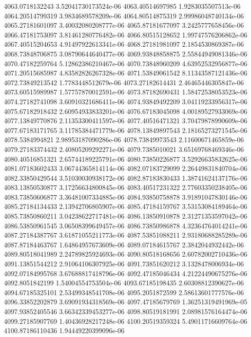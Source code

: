 {4063.0718132243 3.52041730173524e-06
4063.40514697985 1.9283035507513e-06
4064.20514799319 3.9834689578209e-06
4064.80514875319 2.99986048740134e-06
4065.27181601097 3.40032080208777e-06
4065.87181677097 3.2425777658456e-06
4066.47181753097 3.81461280776482e-06
4066.80515128652 1.99747576206862e-06
4067.40515204653 4.91497922613341e-06
4068.27181981097 2.1854530869387e-06
4068.73848706875 3.08790644640477e-06
4069.93848858875 2.55844949081346e-06
4070.47182259764 5.12862386210467e-06
4070.73848960209 4.63952532956877e-06
4071.20515685987 4.83582826267328e-06
4071.53849061542 8.11343587121436e-06
4072.73849213542 1.7783448512679e-06
4073.27182614431 2.46465446305847e-06
4073.60515989987 1.57757870012591e-06
4073.87182690431 1.58472538053523e-06
4074.27182741098 3.60910321686411e-06
4074.93849492209 3.04119233956317e-06
4075.67182918432 2.60954933833201e-06
4076.67183045098 4.00189527933069e-06
4077.13849770876 2.11353300411597e-06
4077.40516471321 3.70479878990609e-06
4077.67183171765 3.11785384471779e-06
4078.13849897543 2.18165273271545e-06
4078.5384994821 2.98953187090286e-06
4078.73849973543 2.11600671465859e-06
4079.27183374432 2.40805209292271e-06
4079.7385010021 3.65169768469346e-06
4080.40516851321 2.65744189225791e-06
4080.73850226877 3.52926635832625e-06
4081.07183602433 3.06744365814114e-06
4082.07183729099 2.26449831840704e-06
4082.33850429544 3.51030030938172e-06
4082.87183830433 1.38741624137176e-06
4083.13850530877 3.17256634800845e-06
4083.40517231322 2.77603350238405e-06
4083.73850606877 3.36481007334885e-06
4084.93850758878 3.91891047830146e-06
4085.27184134433 2.13942706805907e-06
4085.47184159767 3.53153084189464e-06
4085.73850860211 3.04238622717481e-06
4086.13850910878 2.31271353597042e-06
4086.53850961545 3.06508399649457e-06
4086.73850986878 4.32364764014241e-06
4087.27184387767 3.61871055211773e-06
4087.53851088211 2.93180688285289e-06
4087.87184463767 1.64864957673609e-06
4089.07184615767 2.3842044932442e-06
4089.80518041989 2.24789825924693e-06
4090.80518168656 2.60782002710436e-06
4091.13851544212 2.91064106307925e-06
4091.73851620212 3.1328478006934e-06
4092.07184995768 3.67688817418796e-06
4092.47185046434 4.21224490675276e-06
4092.8051842199 1.54004554753504e-06
4093.67185198435 2.60308812390627e-06
4094.67185325101 2.53499348541708e-06
4095.2051872599 2.58613601777576e-06
4096.33852202879 3.69091934318569e-06
4097.47185679769 1.36251319491969e-05
4097.93852405546 3.66342339453277e-06
4098.80519181991 2.08981576164474e-06
4099.27185907769 1.40436928217248e-06
4100.20519359324 5.49011716609764e-06
4100.87186110436 1.94449220399096e-06
}
